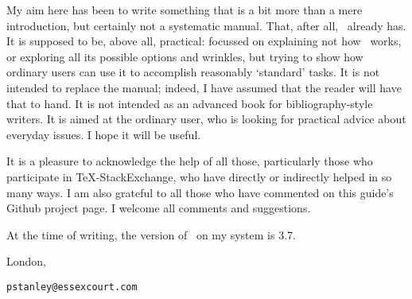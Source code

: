 My aim here has been to write something that is a bit more than a mere
introduction, but certainly not a systematic manual. That, after all,
\biblatex\ already has. It is supposed to be, above all, practical:
focussed on explaining not how \biblatex\ works, or exploring all its
possible options and wrinkles, but trying to show how ordinary users
can use it to accomplish reasonably `standard' tasks. It is not
intended to replace the manual; indeed, I have assumed that the reader
will have that to hand. It is not intended as an advanced book for
bibliography-style writers. It is aimed at the ordinary user, who is
looking for practical advice about everyday issues. I hope it will be
useful.

It is a pleasure to acknowledge the help of all those, particularly
those who participate in \TeX-StackExchange, who have directly or
indirectly helped in so many ways. I am also grateful to all those who
have commented on this guide's Github project page. I welcome all
comments and suggestions.

At the time of writing, the version of \biblatex\ on my system is 3.7.

\hfill{}

\hfill{London, \prefacedate}

\vspace{1ex}

\hfill{\texttt{pstanley@essexcourt.com}}

